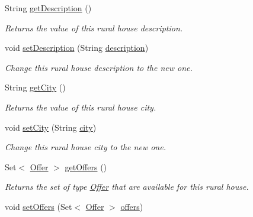 \begin{DoxyCompactItemize}
String \mbox{\hyperlink{classcom_1_1ruralhousejsf_1_1domain_1_1_rural_house_a3d4f77d4ff2e8ca9527bb86816dc1174}{get\+Description}} ()
\begin{DoxyCompactList}\small\item\em Returns the value of this rural house description. \end{DoxyCompactList}\item 
void \mbox{\hyperlink{classcom_1_1ruralhousejsf_1_1domain_1_1_rural_house_ad4e39275d6996833e089c2013bfb9c4b}{set\+Description}} (String \mbox{\hyperlink{classcom_1_1ruralhousejsf_1_1domain_1_1_rural_house_a3cd460d3df936008a7c7580e87680fd4}{description}})
\begin{DoxyCompactList}\small\item\em Change this rural house description to the new one. \end{DoxyCompactList}\item 
String \mbox{\hyperlink{classcom_1_1ruralhousejsf_1_1domain_1_1_rural_house_acb17324965fdc86c270d1b2dc7624083}{get\+City}} ()
\begin{DoxyCompactList}\small\item\em Returns the value of this rural house city. \end{DoxyCompactList}\item 
void \mbox{\hyperlink{classcom_1_1ruralhousejsf_1_1domain_1_1_rural_house_a329be3e41ca6f9e57a0fc887c066ad55}{set\+City}} (String \mbox{\hyperlink{classcom_1_1ruralhousejsf_1_1domain_1_1_rural_house_a495797ff9bd294c83563790e36ec2245}{city}})
\begin{DoxyCompactList}\small\item\em Change this rural house city to the new one. \end{DoxyCompactList}\item 
Set$<$ \mbox{\hyperlink{classcom_1_1ruralhousejsf_1_1domain_1_1_offer}{Offer}} $>$ \mbox{\hyperlink{classcom_1_1ruralhousejsf_1_1domain_1_1_rural_house_a8e5bd3ba4e562e0c1e57e762cdee9447}{get\+Offers}} ()
\begin{DoxyCompactList}\small\item\em Returns the set of type \mbox{\hyperlink{classcom_1_1ruralhousejsf_1_1domain_1_1_offer}{Offer}} that are available for this rural house. \end{DoxyCompactList}\item 
void \mbox{\hyperlink{classcom_1_1ruralhousejsf_1_1domain_1_1_rural_house_a6edffd501fd0be08f923be5a1615e1fb}{set\+Offers}} (Set$<$ \mbox{\hyperlink{classcom_1_1ruralhousejsf_1_1domain_1_1_offer}{Offer}} $>$ \mbox{\hyperlink{classcom_1_1ruralhousejsf_1_1domain_1_1_rural_house_a8e07bbd638166d5d9356828a4ce09488}{offers}})

\end{DoxyCompactItemize}
